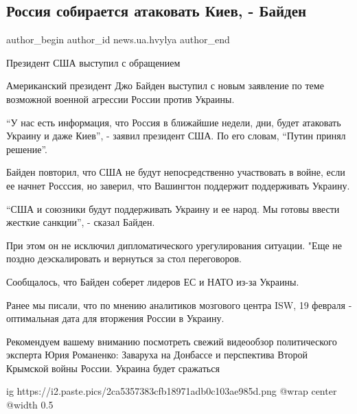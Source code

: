  
 
 
 
 
 
\subsection{Россия собирается атаковать Киев, - Байден}
\label{sec:18_02_2022.stz.news.ua.hvylya.2.rossia_atakovat_kiev_bajden}
 
\ifcmt
 author_begin
   author_id news.ua.hvylya
 author_end
\fi

\begin{zznagolos}
Президент США выступил с обращением	
\end{zznagolos}

Американский президент Джо Байден выступил с новым заявление по теме возможной
военной агрессии России против Украины.


\enquote{У нас есть информация, что Россия в ближайшие недели, дни, будет атаковать
Украину и даже Киев}, - заявил президент США. По его словам, \enquote{Путин принял
решение}.

Байден повторил, что США не будут непосредственно участвовать в войне, если ее
начнет Росссия, но заверил, что Вашингтон поддержит поддерживать Украину.

\enquote{США и союзники будут поддерживать Украину и ее народ. Мы готовы ввести жесткие
санкции}, - сказал Байден.

При этом он не исключил дипломатического урегулирования ситуации. "Еще не
поздно деэскалировать и вернуться за стол переговоров.

Сообщалось, что Байден соберет лидеров ЕС и НАТО из-за Украины.

Ранее мы писали, что по мнению аналитиков мозгового центра ISW, 19 февраля -
оптимальная дата для вторжения России в Украину.

Рекомендуем вашему вниманию посмотреть свежий видеообзор политического эксперта
Юрия Романенко: Заваруха на Донбассе и перспектива Второй Крымской войны
России. Украина будет сражаться

\ifcmt
  ig https://i2.paste.pics/2ca5357383cfb18971adb0c103ae985d.png
  @wrap center
  @width 0.5
\fi
